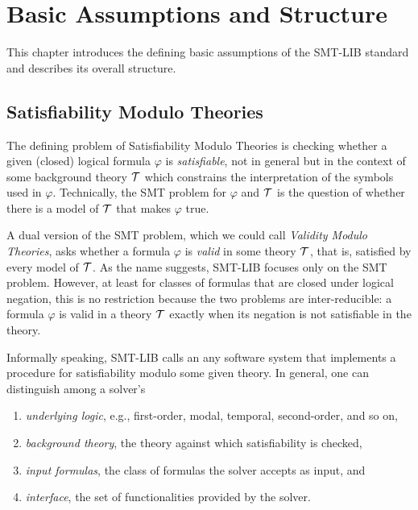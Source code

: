 

\chapter{Basic Assumptions and Structure} 
\thispagestyle{empty}


This chapter introduces the defining basic assumptions 
of the SMT-LIB standard and 
describes its overall structure.


\bigskip

\section{Satisfiability Modulo Theories}

The defining problem of Satisfiability Modulo Theories is checking 
whether a given (closed) logical formula $\varphi$ is \emph{satisfiable},
not in general but in the context of some background theory $\mathcal{T}$
which constrains the interpretation of the symbols used in $\varphi$.
Technically, the SMT problem for $\varphi$ and $\mathcal{T}$ is 
the question of 
whether there is a model of $\mathcal{T}$ that makes $\varphi$ true.
 
A dual version of the SMT problem, 
which we could call \emph{Validity Modulo Theories},
asks whether a formula $\varphi$ is \emph{valid} in some theory $\mathcal{T}$,
that is, satisfied by every model of $\mathcal{T}$.
As the name suggests, SMT-LIB focuses only on the SMT problem.
However, at least for classes of formulas that are closed under logical negation,
this is no restriction because the two problems are inter-reducible:
a formula $\varphi$ is valid in a theory $\mathcal{T}$ exactly when 
its negation is not satisfiable in the theory.

Informally speaking, SMT-LIB calls an 
any software system that implements 
a procedure for satisfiability modulo some given theory.
In general,
one can distinguish among a solver's 
\begin{enumerate}
\item
\emph{underlying logic},
e.g., first-order, modal, temporal, second-order, and so on,

\item
\emph{background theory},
the theory against which satisfiability is checked,

\item
\emph{input formulas}, 
the class of formulas the solver accepts as input,
and

\item
\emph{interface}, 
the set of functionalities provided by the solver.
\end{enumerate}

